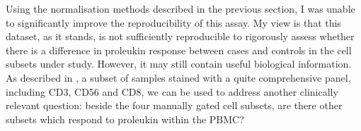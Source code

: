 %

Using the normalisation methods described in the previous section, I was unable to significantly improve the reproducibility of this assay.
My view is that this dataset, as it stands, is not sufficiently reproducible to rigorously assess whether there is a difference in proleukin response between cases and controls in the cell subsets under study.
However, it may still contain useful biological information.
As described in , a subset of samples stained with a quite comprehensive panel, including CD3, CD56 and CD8, we can be used to address another clinically relevant question:
beside the four manually gated cell subsets, are there other subsets which respond to proleukin within the \gls{PBMC}?

